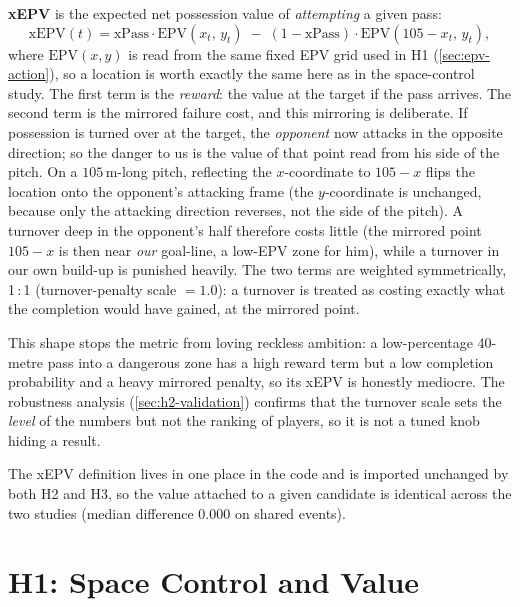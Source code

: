 \documentclass[12pt,a4paper]{article}
\begin{document}
\textbf{xEPV} is the expected net possession value of \emph{attempting} a given pass:
\begin{equation}\label{eq:xepv}
    \text{xEPV}(t) = \text{xPass} \cdot \text{EPV}(x_t,\, y_t) \;-\; (1 - \text{xPass}) \cdot \text{EPV}(105 - x_t,\, y_t),
\end{equation}
where $\text{EPV}(x, y)$ is read from the same fixed EPV grid used in H1 (\cref{sec:epv-action}), so a location is worth exactly the same here as in the space-control study.
The first term is the \emph{reward}: the value at the target if the pass arrives.
The second term is the mirrored failure cost, and this mirroring is deliberate.
If possession is turned over at the target, the \emph{opponent} now attacks in the opposite direction; so the danger to us is the value of that point read from his side of the pitch.
On a $105$\,m-long pitch, reflecting the $x$-coordinate to $105 - x$ flips the location onto the opponent's attacking frame (the $y$-coordinate is unchanged, because only the attacking direction reverses, not the side of the pitch).
A turnover deep in the opponent's half therefore costs little (the mirrored point $105 - x$ is then near \emph{our} goal-line, a low-EPV zone for him), while a turnover in our own build-up is punished heavily.
The two terms are weighted symmetrically, 1\,:\,1 (turnover-penalty scale $= 1.0$): a turnover is treated as costing exactly what the completion would have gained, at the mirrored point.

This shape stops the metric from loving reckless ambition: a low-percentage 40-metre pass into a dangerous zone has a high reward term but a low completion probability and a heavy mirrored penalty, so its xEPV is honestly mediocre.
The robustness analysis (\cref{sec:h2-validation}) confirms that the turnover scale sets the \emph{level} of the numbers but not the ranking of players, so it is not a tuned knob hiding a result.

The xEPV definition lives in one place in the code and is imported unchanged by both H2 and H3, so the value attached to a given candidate is identical across the two studies (median difference $0.000$ on shared events).

\clearpage
\section{H1: Space Control and Value}\label{sec:h1}
\end{document}
